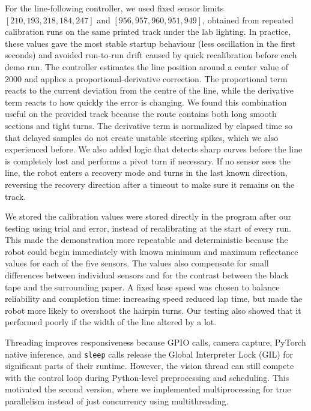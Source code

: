 \documentclass[10pt,a4paper]{article}
\begin{document}
For the line-following controller, we used fixed sensor limits \([210,193,218,184,247]\) and \([956,957,960,951,949]\), obtained from repeated calibration runs on the same printed track under the lab lighting. In practice, these values gave the most stable startup behaviour (less oscillation in the first seconds) and avoided run-to-run drift caused by quick recalibration before each demo run. The controller estimates the line position around a center value of 2000 and applies a proportional-derivative correction. The proportional term reacts to the current deviation from the centre of the line, while the derivative term reacts to how quickly the error is changing. We found this combination useful on the provided track because the route contains both long smooth sections and tight turns. The derivative term is normalized by elapsed time so that delayed samples do not create unstable steering spikes, which we also experienced before. We also added logic that detects sharp curves before the line is completely lost and performs a pivot turn if necessary. If no sensor sees the line, the robot enters a recovery mode and turns in the last known direction, reversing the recovery direction after a timeout to make sure it remains on the track.

We stored the calibration values were stored directly in the program after our testing using trial and error, instead of recalibrating at the start of every run. This made the demonstration more repeatable and deterministic because the robot could begin immediately with known minimum and maximum reflectance values for each of the five sensors. The values also compensate for small differences between individual sensors and for the contrast between the black tape and the surrounding paper. A fixed base speed was chosen to balance reliability and completion time: increasing speed reduced lap time, but made the robot more likely to overshoot the hairpin turns. Our testing also showed that it performed poorly if the width of the line altered by a lot.

Threading improves responsiveness because GPIO calls, camera capture, PyTorch native inference, and \texttt{sleep} calls release the Global Interpreter Lock (GIL) for significant parts of their runtime. However, the vision thread can still compete with the control loop during Python-level preprocessing and scheduling. This motivated the second version, where we implemented multiprocessing for true parallelism instead of just concurrency using multithreading.

\newpage
\end{document}
